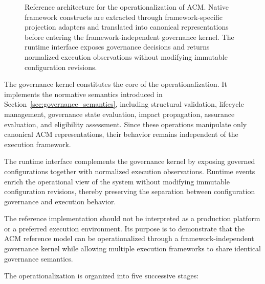 \documentclass[10pt]{article}
\begin{document}
\begin{figure}[t]
\begin{tikzpicture}
\end{tikzpicture}

\caption{Reference architecture for the operationalization of ACM. Native
framework constructs are extracted through framework-specific projection
adapters and translated into canonical representations before entering the
framework-independent governance kernel. The runtime interface exposes
governance decisions and returns normalized execution observations without
modifying immutable configuration revisions.}
\label{fig:acm_reference_architecture}

\end{figure}

The governance kernel constitutes the core of the operationalization. It implements the normative semantics introduced in Section~\ref{sec:governance_semantics}, including structural validation, lifecycle management, governance state evaluation, impact propagation, assurance evaluation, and eligibility assessment. Since these operations manipulate only canonical ACM representations, their behavior remains independent of the execution framework.

The runtime interface complements the governance kernel by exposing governed configurations together with normalized execution observations. Runtime events enrich the operational view of the system without modifying immutable configuration revisions, thereby preserving the separation between configuration governance and execution behavior.

The reference implementation should not be interpreted as a production platform or a preferred execution environment. Its purpose is to demonstrate that the ACM reference model can be operationalized through a framework-independent governance kernel while allowing multiple execution frameworks to share identical governance semantics.

The operationalization is organized into five successive stages:
\end{document}
